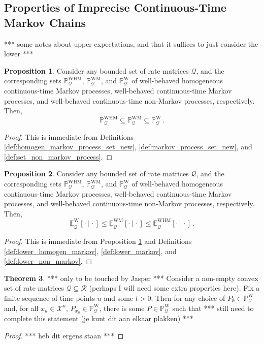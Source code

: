 \documentclass[10pt]{paper}
\theoremstyle{definition}
\newtheorem{theorem}{Theorem}
\newtheorem{proposition}[theorem]{Proposition}
\newcommand{\states}{\mathcal{X}}
\newcommand{\processes}{\mathbb{P}}
\newcommand{\wprocesses}{\processes^{\mathrm{W}}}
\newcommand{\wmprocesses}{\processes^{\mathrm{WM}}}
\newcommand{\whmprocesses}{\processes^{\mathrm{WHM}}}
\newcommand{\rateset}{\mathcal{Q}}
\begin{document}
\subsection{Properties of Imprecise Continuous-Time Markov Chains}

*** some notes about upper expectations, and that it suffices to just consider the lower ***

\begin{proposition}\label{prop:markov_set_subset_of_nonmarkov_set}
Consider any bounded set of rate matrices $\rateset$, and the corresponding sets $\whmprocesses_\rateset$, $\wmprocesses_\rateset$, and $\wprocesses_\rateset$ of well-behaved homogeneous continuous-time Markov processes, well-behaved continuous-time Markov processes, and well-behaved continuous-time non-Markov processes, respectively. Then,
\begin{equation*}
\whmprocesses_\rateset \subseteq \wmprocesses_\rateset \subseteq \wprocesses_\rateset\,.
\end{equation*}
\end{proposition}
\begin{proof}
This is immediate from Definitions \ref{def:homogen_markov_process_set_new}, \ref{def:markov_process_set_new}, and \ref{def:set_non_markov_process}.
\end{proof}

\begin{proposition}\label{prop:lower_exp_markov_bounded_by_nonmarkov}
Consider any bounded set of rate matrices $\rateset$, and the corresponding sets $\whmprocesses_\rateset$, $\wmprocesses_\rateset$, and $\wprocesses_\rateset$ of well-behaved homogeneous continuous-time Markov processes, well-behaved continuous-time Markov processes, and well-behaved continuous-time non-Markov processes, respectively. Then,
\begin{equation*}
\underline{\mathbb{E}}_\rateset^\mathrm{W}[\cdot\,\vert\,\cdot] \leq
\underline{\mathbb{E}}_\rateset^\mathrm{WM}[\cdot\,\vert\,\cdot] \leq
\underline{\mathbb{E}}_\rateset^\mathrm{WHM}[\cdot\,\vert\,\cdot]\,.
\end{equation*}
\end{proposition}
\begin{proof}
This is immediate from Proposition \ref{prop:markov_set_subset_of_nonmarkov_set} and Definitions \ref{def:lower_homogen_markov}, \ref{def:lower_markov}, and \ref{def:lower_non_markov}.
\end{proof}

\begin{theorem}
*** only to be touched by Jasper *** Consider a non-empty convex set of rate matrices $\rateset\subseteq\mathcal{R}$ (perhaps I will need some extra properties here).
Fix a finite sequence of time points $u$ and some $t>0$. Then for any choice of $P_\emptyset\in\wprocesses_\rateset$ and, for all $x_u\in\states^u$, $P_{x_u}\in\wprocesses_\rateset$, there is some $P\in\wprocesses_\rateset$ such that *** still need to complete this statement (je kunt dit aan elkaar plakken) ***
\end{theorem}
\begin{proof}
*** heb dit ergens staan ***
\end{proof}
\end{document}

